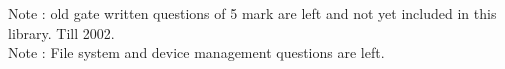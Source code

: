 Note : old gate written questions of 5 mark  are left and not yet included in this library. Till 2002. \\
Note : File system and device management questions are left.




















